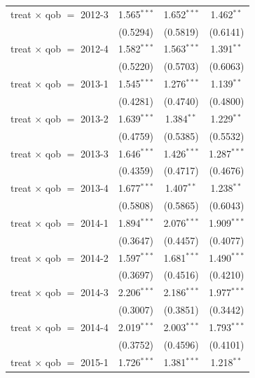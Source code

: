 \begin{table}[htbp]
\begin{tabular}{lccc}
      treat $\times$ qob $=$ 2012-3  & 1.565$^{***}$ & 1.652$^{***}$  & 1.462$^{**}$\\   
                                     & (0.5294)      & (0.5819)       & (0.6141)\\   
      treat $\times$ qob $=$ 2012-4  & 1.582$^{***}$ & 1.563$^{***}$  & 1.391$^{**}$\\   
                                     & (0.5220)      & (0.5703)       & (0.6063)\\   
      treat $\times$ qob $=$ 2013-1  & 1.545$^{***}$ & 1.276$^{***}$  & 1.139$^{**}$\\   
                                     & (0.4281)      & (0.4740)       & (0.4800)\\   
      treat $\times$ qob $=$ 2013-2  & 1.639$^{***}$ & 1.384$^{**}$   & 1.229$^{**}$\\   
                                     & (0.4759)      & (0.5385)       & (0.5532)\\   
      treat $\times$ qob $=$ 2013-3  & 1.646$^{***}$ & 1.426$^{***}$  & 1.287$^{***}$\\   
                                     & (0.4359)      & (0.4717)       & (0.4676)\\   
      treat $\times$ qob $=$ 2013-4  & 1.677$^{***}$ & 1.407$^{**}$   & 1.238$^{**}$\\   
                                     & (0.5808)      & (0.5865)       & (0.6043)\\   
      treat $\times$ qob $=$ 2014-1  & 1.894$^{***}$ & 2.076$^{***}$  & 1.909$^{***}$\\   
                                     & (0.3647)      & (0.4457)       & (0.4077)\\   
      treat $\times$ qob $=$ 2014-2  & 1.597$^{***}$ & 1.681$^{***}$  & 1.490$^{***}$\\   
                                     & (0.3697)      & (0.4516)       & (0.4210)\\   
      treat $\times$ qob $=$ 2014-3  & 2.206$^{***}$ & 2.186$^{***}$  & 1.977$^{***}$\\   
                                     & (0.3007)      & (0.3851)       & (0.3442)\\   
      treat $\times$ qob $=$ 2014-4  & 2.019$^{***}$ & 2.003$^{***}$  & 1.793$^{***}$\\   
                                     & (0.3752)      & (0.4596)       & (0.4101)\\   
      treat $\times$ qob $=$ 2015-1  & 1.726$^{***}$ & 1.381$^{***}$  & 1.218$^{**}$\\   

\end{tabular}
\end{table}
